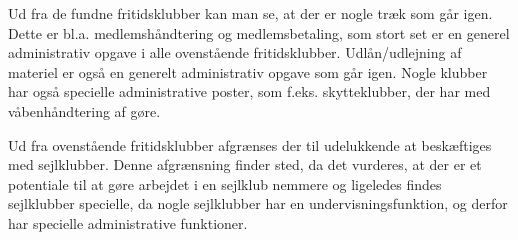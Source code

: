 Ud fra de fundne fritidsklubber kan man se, at der er nogle træk som går igen. Dette er bl.a. medlemshåndtering og
medlemsbetaling, som stort set er en generel administrativ opgave i alle ovenstående fritidsklubber. Udlån/udlejning af materiel er også en generelt administrativ opgave som går igen.
Nogle klubber har
også specielle administrative poster, som f.eks. skytteklubber, der har med våbenhåndtering af gøre.

Ud fra ovenstående fritidsklubber afgrænses der til udelukkende at beskæftiges med sejlklubber. Denne afgrænsning finder
sted, da det vurderes, at der er et potentiale til at gøre arbejdet i en sejlklub nemmere og ligeledes findes
sejlklubber specielle, da nogle sejlklubber har en undervisningsfunktion, og derfor har specielle administrative
funktioner.
